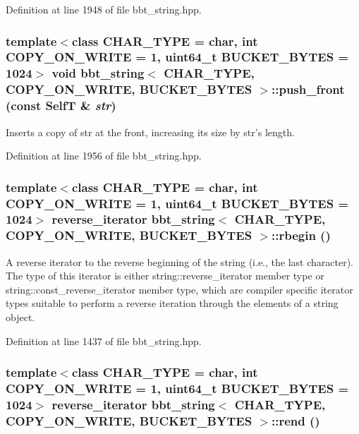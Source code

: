Definition at line 1948 of file bbt\_\-string.hpp.\hypertarget{classbbt__string_c4c5765d2a4ea6575342f460e10f70ba}{
\subsubsection[{push\_\-front}]{\setlength{\rightskip}{0pt plus 5cm}template$<$class CHAR\_\-TYPE  = char, int COPY\_\-ON\_\-WRITE = 1, uint64\_\-t BUCKET\_\-BYTES = 1024$>$ void {\bf bbt\_\-string}$<$ CHAR\_\-TYPE, COPY\_\-ON\_\-WRITE, BUCKET\_\-BYTES $>$::push\_\-front (const {\bf SelfT} \& {\em str})}}
\label{classbbt__string_c4c5765d2a4ea6575342f460e10f70ba}


Inserts a copy of str at the front, increasing its size by str's length. 

Definition at line 1956 of file bbt\_\-string.hpp.\hypertarget{classbbt__string_f65ad28bf03b76f6fe2dee8cc866a2e0}{
\subsubsection[{rbegin}]{\setlength{\rightskip}{0pt plus 5cm}template$<$class CHAR\_\-TYPE  = char, int COPY\_\-ON\_\-WRITE = 1, uint64\_\-t BUCKET\_\-BYTES = 1024$>$ reverse\_\-iterator {\bf bbt\_\-string}$<$ CHAR\_\-TYPE, COPY\_\-ON\_\-WRITE, BUCKET\_\-BYTES $>$::rbegin ()}}
\label{classbbt__string_f65ad28bf03b76f6fe2dee8cc866a2e0}


A reverse iterator to the reverse beginning of the string (i.e., the last character). The type of this iterator is either string::reverse\_\-iterator member type or string::const\_\-reverse\_\-iterator member type, which are compiler specific iterator types suitable to perform a reverse iteration through the elements of a string object. 

Definition at line 1437 of file bbt\_\-string.hpp.\hypertarget{classbbt__string_7f39c0149a22f0d7b9fe1ce776fa2605}{
\subsubsection[{rend}]{\setlength{\rightskip}{0pt plus 5cm}template$<$class CHAR\_\-TYPE  = char, int COPY\_\-ON\_\-WRITE = 1, uint64\_\-t BUCKET\_\-BYTES = 1024$>$ reverse\_\-iterator {\bf bbt\_\-string}$<$ CHAR\_\-TYPE, COPY\_\-ON\_\-WRITE, BUCKET\_\-BYTES $>$::rend ()}}
\label{classbbt__string_7f39c0149a22f0d7b9fe1ce776fa2605}


